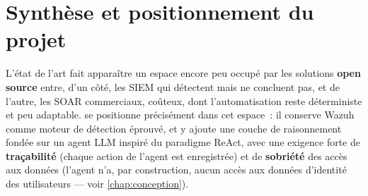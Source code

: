 \section{Synthèse et positionnement du projet}

L'état de l'art fait apparaître un espace encore peu occupé par les
solutions \textbf{open source} entre, d'un côté, les SIEM qui détectent mais
ne concluent pas, et de l'autre, les SOAR commerciaux, coûteux, dont
l'automatisation reste déterministe et peu adaptable. \projectname{} se
positionne précisément dans cet espace~: il conserve Wazuh comme moteur de
détection éprouvé, et y ajoute une couche de raisonnement fondée sur un
agent LLM inspiré du paradigme ReAct, avec une exigence forte de
\textbf{traçabilité} (chaque action de l'agent est enregistrée) et de
\textbf{sobriété} des accès aux données (l'agent n'a, par construction,
aucun accès aux données d'identité des utilisateurs — voir
\cref{chap:conception}).
